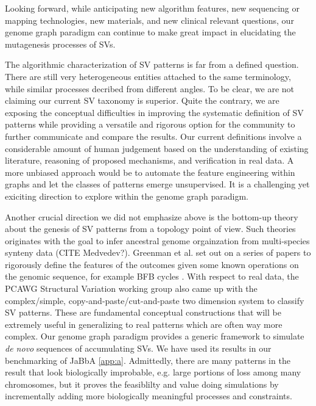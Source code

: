 \documentclass[phd,tocprelim]{cornell}
\begin{document}
Looking forward, while anticipating new algorithm features, new sequencing or mapping technologies, new materials, and new clinical relevant questions, our genome graph paradigm can continue to make great impact in elucidating the mutagenesis processes of SVs.

The algorithmic characterization of SV patterns is far from a defined question. There are still very heterogeneous entities attached to the same terminology, while similar processes decribed from different angles. To be clear, we are not claiming our current SV taxonomy is superior. Quite the contrary, we are exposing the conceptual difficulties in improving the systematic definition of SV patterns while providing a versatile and rigorous option for the community to further communicate and compare the results. Our current definitions involve a considerable amount of human judgement based on the understanding of existing literature, reasoning of proposed mechanisms, and verification in real data. A more unbiased approach would be to automate the feature engineering within graphs and let the classes of patterns emerge unsupervised. It is a challenging yet exiciting direction to explore within the genome graph paradigm.

Another crucial direction we did not emphasize above is the bottom-up theory about the genesis of SV patterns from a topology point of view. Such theories originates with the goal to infer ancestral genome orgainzation from multi-species synteny data (CITE Medvedev?). Greenman et al. set out on a series of papers to rigorously define the features of the outcomes given some known operations on the genomic sequence, for example BFB cycles \cite{greenman2016-ho}. With respect to real data, the PCAWG Structural Variation working group also came up with the complex/simple, copy-and-paste/cut-and-paste two dimension system to classify SV patterns. These are fundamental conceptual constructions that will be extremely useful in generalizing to real patterns which are often way more complex. Our genome graph paradigm provides a generic framework to simulate \textit{de novo} sequences of accumulating SVs. We have used its results in our benchmarking of JaBbA \ref{app:a}. Admittedly, there are many patterns in the result that look biologically improbable, e.g. large portions of loss among many chromosomes, but it proves the feasiblilty and value doing simulations by incrementally adding more biologically meaningful processes and constraints.

\end{document}
